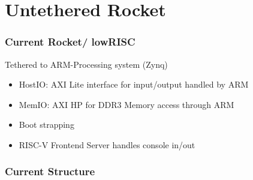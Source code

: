 \documentclass{beamer}
\begin{document}
\section{Untethered Rocket}
\begin{frame}
	\frametitle{Current Rocket/ lowRISC}
	Tethered to ARM-Processing system (Zynq)
	\begin{itemize}
	\item HostIO: AXI Lite interface for input/output handled by ARM
	\item MemIO: AXI HP for DDR3 Memory access through ARM
	\item Boot strapping
	\item RISC-V Frontend Server handles console in/out
	\end{itemize}
\end{frame}

\begin{frame}
	\frametitle{Current Structure}
	\begin{figure}[!h]
		\begin{center}
	\end{center}
	\end{figure}
\end{frame}
\end{document}
